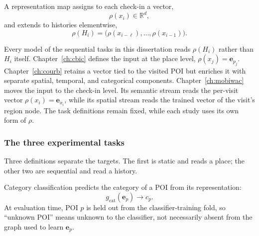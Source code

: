 \begin{definition}\label{def:fund:repmap}
A representation map assigns to each check-in a vector,
\begin{equation}
    \rho(x_i)\in\mathbb{R}^{d},
\end{equation}
and extends to histories elementwise,
\begin{equation}
    \rho(H_i)=\bigl(\rho(x_{i-\ell}),\ldots,\rho(x_{i-1})\bigr).
\end{equation}
\end{definition}

Every model of the sequential tasks in this dissertation reads $\rho(H_i)$ rather than
$H_i$ itself. Chapter~\ref{ch:cbic} defines the input at the place level,
$\rho(x_j)=\mathbf{e}_{p_j}$. Chapter~\ref{ch:courb} retains a vector tied to the visited
POI but enriches it with separate spatial, temporal, and categorical components.
Chapter~\ref{ch:mobiwac} moves the input to the check-in level. Its semantic stream reads
the per-visit vector $\rho(x_i)=\mathbf{e}_{x_i}$, while its spatial stream reads the
trained vector of the visit's region node. The task definitions remain fixed, while
each study uses its own form of $\rho$.

\subsubsection{The three experimental tasks}

Three definitions separate the targets. The first is static and reads a place; the
other two are sequential and read a history.

\begin{definition}\label{def:fund:catclf}
Category classification predicts the category of a POI from its representation:
\begin{equation}
    g_{\mathrm{cat}}(\mathbf{e}_p)\longrightarrow c_p.
\end{equation}
At evaluation time, POI $p$ is held out from the classifier-training fold, so
``unknown POI'' means unknown to the classifier, not necessarily absent from the graph
used to learn $\mathbf{e}_p$.
\end{definition}

